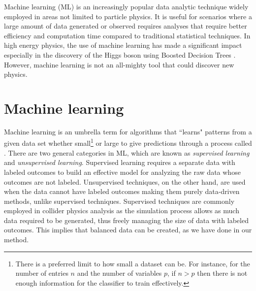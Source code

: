 Machine learning (ML) is an increasingly popular data analytic technique widely employed in areas not limited to particle physics. It is useful for scenarios where a large amount of data generated or observed requires analyses that require better efficiency and computation time compared to traditional statistical techniques. In high energy physics, the use of machine learning has made a significant impact especially in the discovery of the Higgs boson using Boosted Decision Trees \cite{chatrchyan2012observation, aad2012observation, chen2015higgs}. However, machine learning is not an all-mighty tool that could discover new physics. \\


\section{Machine learning}
Machine learning is an umbrella term for algorithms that ``learns" patterns from a given data set whether small\footnote{There is a preferred limit to how small a dataset can be. For instance, for the number of entries $n$ and the number of variables $p$, if $n>p$ then there is not enough information for the classifier to train effectively.} or large to give predictions through a process called . There are two general categories in ML, which are known as \textit{supervised learning} and \textit{unsupervised learning}. Supervised learning requires a separate data with labeled outcomes to build an effective model for analyzing the raw data whose outcomes are not labeled. Unsupervised techniques, on the other hand, are used when the data cannot have labeled outcomes making them purely data-driven methods, unlike supervised techniques. Supervised techniques are commonly employed in collider physics analysis as the simulation process allows as much data required to be generated, thus freely managing the size of data with labeled outcomes. This implies that balanced data can be created, as we have done in our method. \\

